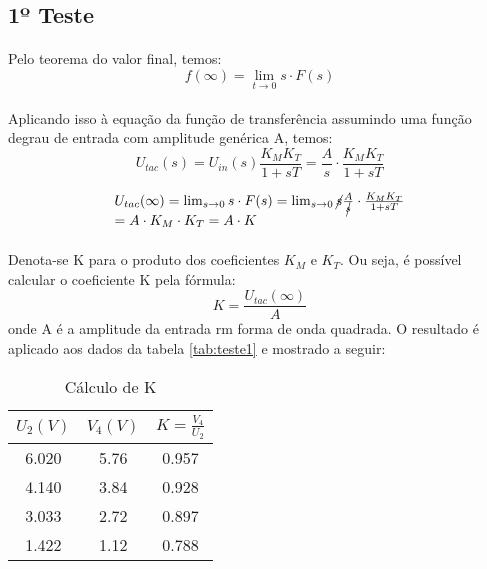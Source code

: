 \subsection{1º Teste}
\paragraph{}
Pelo teorema do valor final, temos:\\
\begin{equation}
f(\infty)=\lim_{t\rightarrow 0} s\cdot F(s)
\end{equation}

\paragraph{}
Aplicando isso à equação da função de transferência assumindo uma função degrau de entrada com amplitude genérica A, temos:
\begin{equation}
U_{tac}(s)=U_{in}(s)\frac{K_MK_T}{1+sT}=\frac{A}{s}\cdot\frac{K_MK_T}{1+sT} 
\end{equation}

\begin{equation}
\begin{array}{l}
U_{tac}(\infty)=\lim_{s \rightarrow 0}s\cdot F(s)=\lim_{s \rightarrow 0}\cancel{s}\frac{A}{\cancel{s}}\cdot\frac{K_MK_T}{1+sT} \\
=A\cdot K_M\cdot K_T= A\cdot K
\end{array}
\end{equation}

\paragraph{}
Denota-se K para o produto dos coeficientes $K_M$ e $K_T$. Ou seja, é possível calcular o coeficiente K pela fórmula:
\begin{equation}
K=\frac{U_{tac}(\infty)}{A}
\label{eq:procedimento1-2}
\end{equation}
onde A é a amplitude da entrada rm forma de onda quadrada. O resultado é aplicado aos dados da tabela \ref{tab:teste1} e mostrado a seguir:

\begin{table}[H]
\centering
\begin{tabular}{|c|c|c|}
\hline
$U_2(V)$ & $V_4(V)$ & $K=\frac{V_4}{U_2}$\\
\hline
6.020 & 5.76 & 0.957\\
\hline
4.140 & 3.84 & 0.928\\
\hline
3.033 & 2.72 & 0.897\\
\hline
1.422 & 1.12 & 0.788\\
\hline
\end{tabular}
\caption{Cálculo de K}
\label{tab:analise1}
\end{table}

